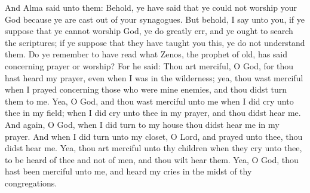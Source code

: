 \bverse \iffalse And Alma said unto them: Behold, ye have said that ye could not worship your God because ye are cast out of your synagogues.  But behold, I say unto you, if ye suppose that ye cannot worship God, ye do greatly err, and ye ought to search the scriptures; if ye suppose that they have taught you this, ye do not understand them. \fi
And Alma said unto them: Behold, ye have said that ye could not worship your God because ye are cast out of your synagogues.  But behold, I say unto you, if ye suppose that ye cannot worship God, ye do greatly err, and ye ought to search the scriptures; if ye suppose that they have taught you this, ye do not understand them.
\bverse \iffalse Do ye remember to have read what Zenos, the prophet of old, has said concerning prayer or worship? \fi
Do ye remember to have read what Zenos, the prophet of old, has said concerning prayer or worship?
\bverse \iffalse For he said: Thou art merciful, O God, for thou hast heard my prayer, even when I was in the wilderness; yea, thou wast merciful when I prayed concerning those who were mine enemies, and thou didst turn them to me. \fi
For he said: Thou art merciful, O God, for thou hast heard my prayer, even when I was in the wilderness; yea, thou wast merciful when I prayed concerning those who were mine enemies, and thou didst turn them to me.
\bverse \iffalse Yea, O God, and thou wast merciful unto me when I did cry unto thee in my field; when I did cry unto thee in my prayer, and thou didst hear me. \fi
Yea, O God, and thou wast merciful unto me when I did cry unto thee in my field; when I did cry unto thee in my prayer, and thou didst hear me.
\bverse \iffalse And again, O God, when I did turn to my house thou didst hear me in my prayer. \fi
And again, O God, when I did turn to my house thou didst hear me in my prayer.
\bverse \iffalse And when I did turn unto my closet, O Lord, and prayed unto thee, thou didst hear me. \fi
And when I did turn unto my closet, O Lord, and prayed unto thee, thou didst hear me.
\bverse \iffalse Yea, thou art merciful unto thy children when they cry unto thee, to be heard of thee and not of men, and thou wilt hear them. \fi
Yea, thou art merciful unto thy children when they cry unto thee, to be heard of thee and not of men, and thou wilt hear them.
\bverse \iffalse Yea, O God, thou hast been merciful unto me, and heard my cries in the midst of thy congregations. \fi
Yea, O God, thou hast been merciful unto me, and heard my cries in the midst of thy congregations.
